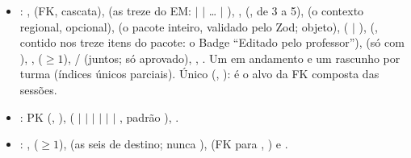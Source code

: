\begin{itemize}
  \item {}: ,  (FK, cascata),
     (as treze do EM:  $|$
     $|$ \ldots{} $|$ ),
    ,  (, de 3 a 5),  (o
    contexto regional, opcional),  (o pacote inteiro,
    validado pelo Zod; objeto),  ( $|$ ),
     (, contido nos treze itens do pacote: o Badge
    \enquote{Editado pelo professor}),  (só com
    ), ,  ($\geq 1$),
    / (juntos;  só aprovado),
    , . Um em andamento e um rascunho por
    turma (índices únicos parciais). Único (, ): é o
    alvo da FK composta das sessões.
  \item {}: PK (, ),
     ( $|$  $|$  $|$
     $|$  $|$  $|$ ,
    padrão ), .
  \item {}: , 
    ($\geq 1$),  (as seis de destino; nunca ),
     (FK para , ) e .
\end{itemize}

\subsection{}

